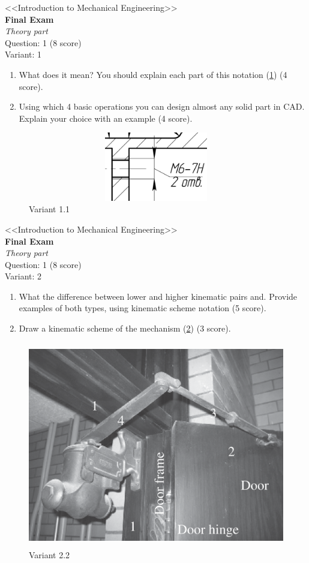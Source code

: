 \documentclass[12pt]{article}
\newcommand\pic[1]{(\cref{#1})} %
\newcommand\ttask[2]{
        \begin{center}
            \LARGE <<Introduction to Mechanical Engineering>> \\ \textbf{Final Exam} \\ \textit{Theory part} \\
            Question: 1 (8 score) \\ Variant: #1
        \end{center}
    #2
    \newpage
    }
\begin{document}
\ttask{1}{\begin{enumerate}
    \item What does it mean? You should explain each part of this notation \pic{fig:resources_THEORY/quiz1_task1.png} (4 score).
    \item Using which 4 basic operations you can design almost any solid part in CAD. Explain your choice with an example (4 score).
\end{enumerate}
\begin{figure}[H]
    \centering\includegraphics[height=3cm,width=1\textwidth,keepaspectratio]{resources_THEORY/quiz1_task1.png}
    \caption{Variant 1.1}
    \label{fig:resources_THEORY/quiz1_task1.png}
\end{figure}}

\ttask{2}{
\begin{enumerate}
    \item What the difference between lower and higher kinematic pairs and. Provide examples of both types, using kinematic scheme notation (5 score).
    \item Draw a kinematic scheme of the mechanism \pic{fig:resources_THEORY/quiz1_task2.png} (3 score).
\end{enumerate}
\begin{figure}[H]
    \centering\includegraphics[height=9cm,width=1\textwidth,keepaspectratio]{resources_THEORY/quiz1_task2.png}
    \caption{Variant 2.2}
    \label{fig:resources_THEORY/quiz1_task2.png}
\end{figure}}
\end{document}
